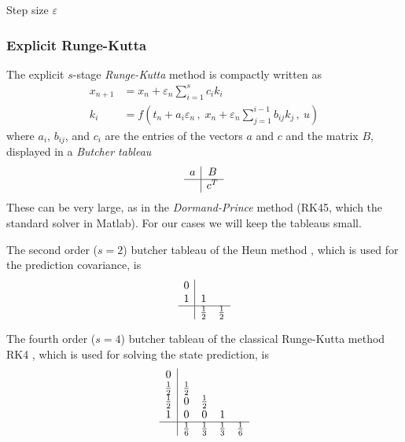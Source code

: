 Step size $\varepsilon$

\subsubsection{Explicit Runge-Kutta}

The explicit $s$-stage \textit{Runge-Kutta} method is compactly written as \cite{griffiths2010}
\begin{align}
    x_{n+1} &= x_n + \varepsilon_n \sum_{i=1}^{s} c_i k_i
    \\
    k_i &= f \left( t_n + a_i \varepsilon_n \, , \; x_n + \varepsilon_n \sum_{j=1}^{i-1} b_{ij} k_j \, , \ u \right) 
\end{align}
where $a_i$, $b_{ij}$, and $c_i$ are the entries of the vectors $a$ and $c$ and the matrix $B$, displayed in a \textit{Butcher tableau}
\begin{equation}
    \begin{array}{c|c}
        a & B \\
        \hline 
        & c^T
        \end{array}
    \label{eq:appendix_general_butcher}
\end{equation}
These can be very large, as in the \textit{Dormand-Prince} method (RK45, which the standard solver in Matlab).
For our cases we will keep the tableaus small.

The second order ($s=2$) butcher tableau of the Heun method \cite{griffiths2010}, which is used for the prediction covariance, is  
\begin{equation}
    \begin{array}{c|cc}
        0 &  &   \\
        1 & 1 &  \\
        \hline 
        & \frac{1}{2} & \frac{1}{2} 
        \end{array}
    \label{eq:appendix_heun_butcher}
\end{equation}

The fourth order ($s=4$) butcher tableau of the classical Runge-Kutta method RK4 \cite{griffiths2010}, which is used for solving the state prediction, is 
\begin{equation}
    \begin{array}{c|cccc}
        0 &  &  &  &  \\
        \frac{1}{2} & \frac{1}{2} &  &  &  \\
        \frac{1}{2} & 0 & \frac{1}{2} & & \\
        1 & 0 & 0 & 1 &  \\
        \hline 
        & \frac{1}{6} & \frac{1}{3} & \frac{1}{3} & \frac{1}{6}
    \end{array}
    \label{eq:appendix_rk4_butcher}
\end{equation}